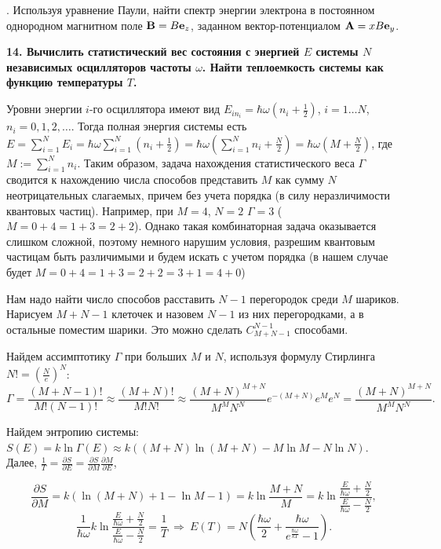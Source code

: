\documentclass[a4paper,12pt]{article}
\begin{document}
. Используя уравнение Паули, найти спектр энергии
электрона в постоянном однородном магнитном поле ${\bf B} = B{\bf
e}_z $, заданном вектор-потенциалом ${\bf A} = xB{\bf e}_y $.

\noindent\textbf{14. Вычислить статистический вес состояния с энергией
$E$ системы $N$ независимых осцилляторов частоты $\omega $. Найти
теплоемкость системы как функцию температуры $T$.}

Уровни энергии $i$-го осциллятора имеют вид
$E_{in_i}=\hbar\omega(n_i+\frac12)$, $i=1\ldots N$, $n_i=0,1,2,\ldots$.
Тогда полная энергия системы есть $E=\sum\limits_{i=1}^NE_i=
\hbar\omega\sum\limits_{i=1}^N(n_i+\frac12)=
\hbar\omega\left(\sum\limits_{i=1}^Nn_i+\frac N2\right)=
\hbar\omega(M+\frac N2)$, где $M:=\sum\limits_{i=1}^Nn_i$.
Таким образом, задача нахождения статистического веса $\Gamma$ сводится к
нахождению числа способов представить $M$ как сумму $N$ неотрицательных
слагаемых, причем без учета порядка (в силу неразличимости квантовых частиц).
Например, при $M=4$, $N=2$ $\Gamma=3$ ($M=0+4=1+3=2+2$).
Однако такая комбинаторная задача
оказывается слишком сложной, поэтому немного нарушим условия, разрешим
квантовым частицам быть различимыми и будем искать с учетом порядка
(в нашем случае будет $M=0+4=1+3=2+2=3+1=4+0$)

Нам надо найти число способов расставить $N-1$ перегородок среди $M$ шариков.
Нарисуем $M+N-1$ клеточек и назовем $N-1$ из них перегородками, а в остальные
поместим шарики. Это можно сделать $C_{M+N-1}^{N-1}$ способами.

Найдем ассимптотику $\Gamma$ при больших $M$ и $N$, используя формулу
Стирлинга $N!=\left(\frac Ne\right)^N$:
$$\Gamma=\frac{(M+N-1)!}{M!(N-1)!}\approx\frac{(M+N)!}{M!N!}\approx
\frac{(M+N)^{M+N}}{M^MN^N}e^{-(M+N)}e^Me^N=\frac{(M+N)^{M+N}}{M^MN^N}.$$

Найдем энтропию системы: $S(E)=k\ln\Gamma(E)\approx k((M+N)\ln(M+N)-
M\ln M-N\ln N)$. Далее, $\frac 1T=\frac{\partial S}{\partial E}=
\frac{\partial S}{\partial M}\frac{\partial M}{\partial E}$,

$$\frac{\partial S}{\partial M}=k(\ln(M+N)+1-\ln M-1)=
  k\ln\frac{M+N}M=k\ln\frac{\frac E{\hbar\omega}+\frac N2}
                           {\frac E{\hbar\omega}-\frac N2},$$
%
$$\frac1{\hbar\omega}k\ln\frac{\frac E{\hbar\omega}+\frac N2}
                              {\frac E{\hbar\omega}-\frac N2}=\frac1T
\ \Rightarrow\ %
E(T)=N\left(\frac{\hbar\omega}2+\frac{\hbar\omega}
 {e^{\frac{\hbar\omega}{kT}}-1}\right).$$
\end{document}
